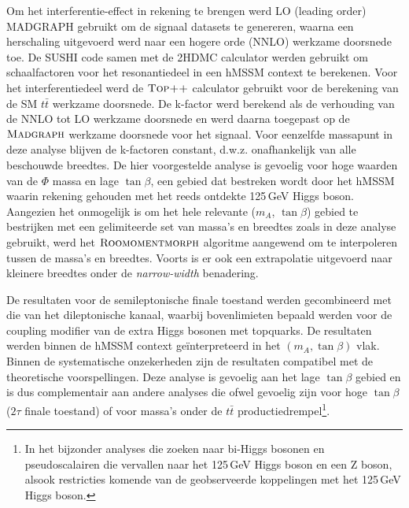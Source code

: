 Om het interferentie-effect in rekening te brengen werd LO (leading order)
MADGRAPH gebruikt om de signaal datasets te genereren, waarna een herschaling
uitgevoerd werd naar een hogere orde (NNLO) werkzame doorsnede toe. De SUSHI
code samen met de 2HDMC calculator werden gebruikt om schaalfactoren voor het
resonantiedeel in een hMSSM context te berekenen. 
Voor het interferentiedeel werd de $\textsc{Top++}$
calculator gebruikt voor de berekening van de SM $t \bar t$ werkzame
doorsnede. De k-factor werd  berekend als de verhouding van de NNLO tot LO werkzame
doorsnede en werd daarna toegepast op de $\textsc{Madgraph}$ werkzame doorsnede voor het
signaal. Voor eenzelfde massapunt in deze analyse blijven de k-factoren
constant, d.w.z. onafhankelijk van alle beschouwde breedtes.  
De hier voorgestelde analyse is gevoelig voor hoge waarden van de $\Phi$ massa
en lage $\tan \beta$, een gebied dat bestreken wordt door het hMSSM waarin
rekening gehouden met het reeds ontdekte 125\,GeV Higgs boson. Aangezien het
onmogelijk is om het hele relevante ($m_A$, $\tan\beta$) gebied te bestrijken met een
gelimiteerde set van massa's en breedtes zoals in deze analyse gebruikt, werd
het $\textsc{Roomomentmorph}$ algoritme aangewend om te interpoleren tussen de
massa's en breedtes. Voorts is er ook een extrapolatie uitgevoerd naar
kleinere breedtes onder de {\it narrow-width} benadering.     

De resultaten voor de semileptonische finale toestand werden gecombineerd met
die van het dileptonische
kanaal, waarbij bovenlimieten bepaald werden voor de coupling modifier van de extra Higgs
bosonen met topquarks. De resultaten
werden binnen de hMSSM context ge\"interpreteerd in het $(m_A,
\tan\beta)$ vlak. Binnen de systematische onzekerheden zijn de resultaten
compatibel met de theoretische 
voorspellingen. Deze analyse is
gevoelig aan het lage $\tan\beta$ gebied en is dus complementair aan andere
analyses die ofwel gevoelig zijn voor hoge $\tan\beta$ ($2\tau$ finale
toestand) of voor massa's onder de $t\bar t$ productiedrempel\footnote{In
  het bijzonder analyses die zoeken naar bi-Higgs bosonen en pseudoscalairen die
  vervallen naar het 125\,GeV Higgs boson en een Z boson, alsook restricties
  komende van de geobserveerde koppelingen met het 125\,GeV Higgs boson.}.    

